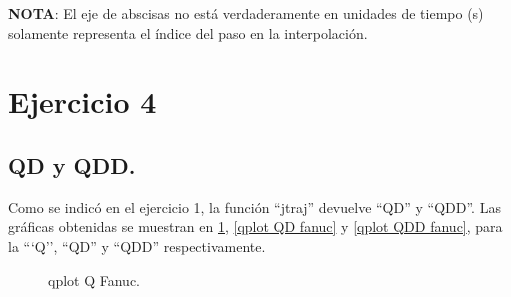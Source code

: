 \documentclass[a4paper,12pt]{article}
\begin{document}
\textbf{NOTA}: El eje de abscisas no está verdaderamente en unidades de tiempo (s)
solamente representa el índice del paso en la interpolación.

\section{Ejercicio 4}
\subsection{QD y QDD.}
Como se indicó en el ejercicio 1, la función ``jtraj'' devuelve
``QD'' y ``QDD''.
Las gráficas obtenidas se muestran en \cref{qplot Q fanuc}, \cref{qplot QD fanuc} y \cref{qplot QDD fanuc}, para la ```Q'', ``QD'' y ``QDD'' respectivamente.

\begin{figure}[H]
    \centering
    \begin{adjustbox}{scale = 0.65, max width=\columnwidth}
    \end{adjustbox}
    \caption{qplot Q Fanuc.}
    \label{qplot Q fanuc}
\end{figure}
\end{document}
